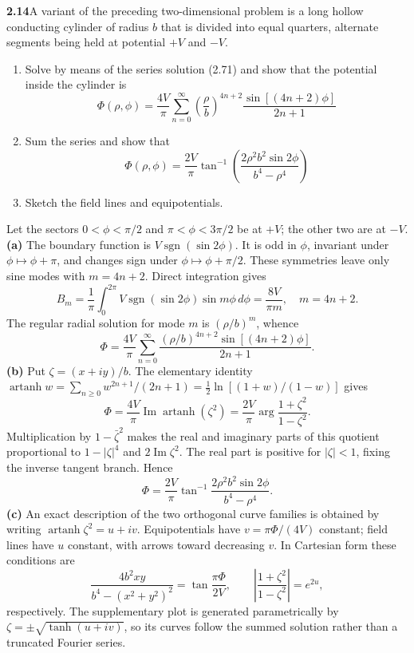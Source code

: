 \par\bigskip
\noindent\textbf{2.14}\quad A variant of the preceding two-dimensional problem is a long hollow conducting cylinder of radius $b$ that is divided into equal quarters, alternate segments being held at potential $+V$ and $-V$.
\begin{enumerate}
\item[(a)] Solve by means of the series solution (2.71) and show that the potential inside the cylinder is
\[
\Phi(\rho,\phi)=\frac{4V}{\pi}\sum_{n=0}^{\infty}\left(\frac{\rho}{b}\right)^{4n+2}\frac{\sin[(4n+2)\phi]}{2n+1}
\]
\item[(b)] Sum the series and show that
\[
\Phi(\rho,\phi)=\frac{2V}{\pi}\tan^{-1}\!\left(\frac{2\rho^{2}b^{2}\sin2\phi}{b^{4}-\rho^{4}}\right)
\]
\item[(c)] Sketch the field lines and equipotentials.
\end{enumerate}
\solution
Let the sectors $0<\phi<\pi/2$ and $\pi<\phi<3\pi/2$ be at $+V$;
the other two are at $-V$.
\textbf{(a)} The boundary function is $V\operatorname{sgn}(\sin2\phi)$.
It is odd in $\phi$, invariant under $\phi\mapsto\phi+\pi$, and
changes sign under $\phi\mapsto\phi+\pi/2$. These symmetries leave
only sine modes with $m=4n+2$. Direct integration gives
\[
B_m=\frac1\pi\int_0^{2\pi}V\operatorname{sgn}(\sin2\phi)
                                  \sin m\phi\,d\phi
=\frac{8V}{\pi m},\quad m=4n+2.
\]
The regular radial solution for mode $m$ is $(\rho/b)^m$, whence
\[
\boxed{\Phi=\frac{4V}{\pi}\sum_{n=0}^\infty
 \frac{(\rho/b)^{4n+2}\sin[(4n+2)\phi]}{2n+1}.}
\]
\textbf{(b)} Put $\zeta=(x+iy)/b$. The elementary identity
$\operatorname{artanh}w=\sum_{n\geq0}w^{2n+1}/(2n+1)
=\tfrac12\ln[(1+w)/(1-w)]$ gives
\[
\Phi=\frac{4V}{\pi}\operatorname{Im}\operatorname{artanh}(\zeta^2)
=\frac{2V}{\pi}\arg\frac{1+\zeta^2}{1-\zeta^2}.
\]
Multiplication by $1-\bar\zeta^2$ makes the real and imaginary
parts of this quotient proportional to
$1-|\zeta|^4$ and $2\operatorname{Im}\zeta^2$. The real part is
positive for $|\zeta|<1$, fixing the inverse tangent branch. Hence
\[
\boxed{\Phi=\frac{2V}{\pi}\tan^{-1}
 \frac{2\rho^2b^2\sin2\phi}{b^4-\rho^4}.}
\]
\textbf{(c)} An exact description of the two orthogonal curve families
is obtained by writing
$\operatorname{artanh}\zeta^2=u+iv$. Equipotentials have
$v=\pi\Phi/(4V)$ constant; field lines have $u$ constant, with
arrows toward decreasing $v$. In Cartesian form these conditions are
\[
\frac{4b^2xy}{b^4-(x^2+y^2)^2}
 =\tan\frac{\pi\Phi}{2V},\qquad
\left|\frac{1+\zeta^2}{1-\zeta^2}\right|=e^{2u},
\]
respectively. The supplementary plot is generated parametrically by
$\zeta=\pm\sqrt{\tanh(u+iv)}$, so its curves follow the summed
solution rather than a truncated Fourier series.
\begin{center}

\end{center}

